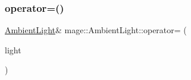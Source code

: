 \subsubsection{\texorpdfstring{operator=()}{operator=()}\hspace{0.1cm}{\footnotesize\ttfamily [2/2]}}
{\footnotesize\ttfamily \hyperlink{classmage_1_1_ambient_light}{Ambient\+Light}\& mage\+::\+Ambient\+Light\+::operator= (\begin{DoxyParamCaption}\item[{\hyperlink{classmage_1_1_ambient_light}{Ambient\+Light} \&\&}]{light }\end{DoxyParamCaption})\hspace{0.3cm}{\ttfamily [delete]}}

